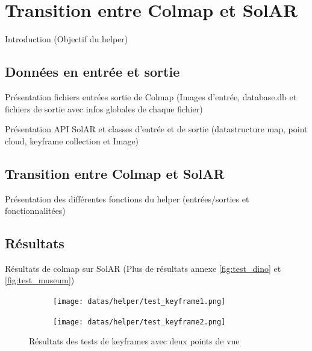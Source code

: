\chapter{Transition entre Colmap et SolAR}

Introduction (Objectif du helper)

\section{Données en entrée et sortie}

Présentation fichiers entrées sortie de Colmap (Images d'entrée, database.db et fichiers de sortie avec infos globales de chaque fichier)

Présentation API SolAR et classes d'entrée et de sortie (datastructure map, point cloud, keyframe collection et Image)

\section{Transition entre Colmap et SolAR}

Présentation des différentes fonctions du helper (entrées/sorties et fonctionnalitées)

\section{Résultats}

Résultats de colmap sur SolAR (Plus de résultats annexe \ref{fig:test_dino} et \ref{fig:test_museum})

\begin{figure}[ht]
    \centering
    \begin{subfigure}{0.45\textwidth}
        \texttt{[image: datas/helper/test\_keyframe1.png]}
    \end{subfigure}
    \begin{subfigure}{0.45\textwidth}
        \texttt{[image: datas/helper/test\_keyframe2.png]}
    \end{subfigure}

    \caption{Résultats des tests de keyframes avec deux points de vue}
    \label{fig:keyframe_canap}
\end{figure}



